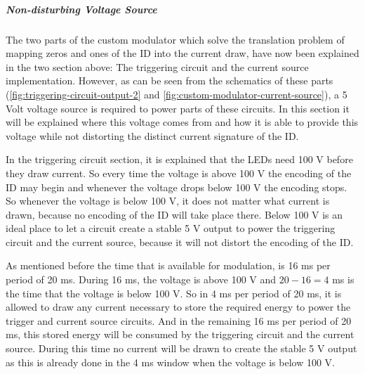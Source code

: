 




\subparagraph{Non-disturbing Voltage Source}

		
	The two parts of the custom modulator which solve the translation problem of mapping zeros and ones of the ID into the current draw, have now been explained in the two section above: The triggering circuit and the current source implementation.
	However, as can be seen from the schematics of these parts (\autoref{fig:triggering-circuit-output-2} and \autoref{fig:custom-modulator-current-source}), a 5 Volt voltage source is required to power parts of these circuits.
	In this section it will be explained where this voltage comes from and how it is able to provide this voltage while not distorting the distinct current signature of the ID.


	In the triggering circuit section, it is explained that the LEDs need 100 V before they draw current.
	So every time the voltage is above 100 V the encoding of the ID may begin and whenever the voltage drops below 100 V the encoding stops.
	So whenever the voltage is below 100 V, it does not matter what current is drawn, because no encoding of the ID will take place there.
	Below 100 V is an ideal place to let a circuit create a stable 5 V output to power the triggering circuit and the current source, because it will not distort the encoding of the ID.

	As mentioned before the time that is available for modulation, is 16 ms per period of 20 ms.
	During 16 ms, the voltage is above 100 V and $20 - 16 = 4$ ms is the time that the voltage is below 100 V.
	So in 4 ms per period of 20 ms, it is allowed to draw any current necessary to store the required energy to power the trigger and current source circuits.
	And in the remaining 16 ms per period of 20 ms, this stored energy will be consumed by the triggering circuit and the current source.
	During this time no current will be drawn to create the stable 5 V output as this is already done in the 4 ms window when the voltage is below 100 V.


